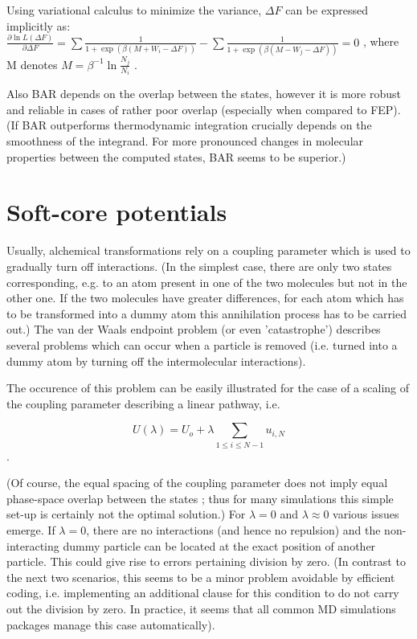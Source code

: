 Using variational calculus to minimize the variance, $\Delta F$ can
be expressed implicitly as:$\frac{\partial\ln L\left(\Delta F\right)}{\partial\Delta F}=\sum\frac{1}{1+\exp\left(\beta\left(M+W_{i}-\Delta F\right)\right)}-\sum\frac{1}{1+\exp\left(\beta\left(M-W_{j}-\Delta F\right)\right)}=0$
, where M denotes $M=\beta^{-1}\ln\frac{N_{j}}{N_{i}}$ \cite{Shirts.2003}.

Also BAR depends on the overlap between the states, however it is
more robust and reliable in cases of rather poor overlap \cite{Ruiter.2013}
(especially when compared to FEP). (If BAR outperforms thermodynamic
integration crucially depends on the smoothness of the integrand.
For more pronounced changes in molecular properties between the computed
states, BAR seems to be superior\cite{Shirts.2013}.)

\section{Soft-core potentials}

Usually, alchemical transformations rely on a coupling parameter which
is used to gradually turn off interactions. (In the simplest case,
there are only two states corresponding, e.g. to an atom present in
one of the two molecules but not in the other one. If the two molecules
have greater differences, for each atom which has to be transformed
into a dummy atom this annihilation process has to be carried out.)
The van der Waals endpoint problem (or even 'catastrophe') describes
several problems which can occur when a particle is removed (i.e.
turned into a dummy atom by turning off the intermolecular interactions).
\cite{Boresch.2011}

The occurence of this problem can be easily illustrated for the case
of a scaling of the coupling parameter describing a linear pathway,
i.e.

\[
U\left(\lambda\right)=U_{o}+\lambda\sum_{1\leq i\leq N-1}u_{i,N}
\]
.

(Of course, the equal spacing of the coupling parameter does not imply
equal phase-space overlap between the states \cite{Shirts.2013};
thus for many simulations this simple set-up is certainly not the
optimal solution.) For $\lambda=0$ and $\lambda\approx0$ various
issues emerge. If $\lambda=0$, there are no interactions (and hence
no repulsion) and the non-interacting dummy particle can be located
at the exact position of another particle. This could give rise to
errors pertaining division by zero. (In contrast to the next two scenarios,
this seems to be a minor problem avoidable by efficient coding, i.e.
implementing an additional clause for this condition to do not carry
out the division by zero. In practice, it seems that all common MD
simulations packages manage this case automatically\cite{Boresch.2011}).

